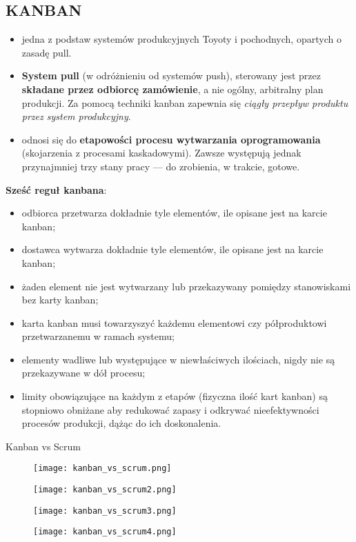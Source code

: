 \documentclass[a4paper]{article}
\begin{document}
    \subsection{KANBAN}
    \begin{itemize}
        \item jedna z podstaw systemów produkcyjnych Toyoty  i pochodnych, opartych o zasadę pull.
        \item \textbf{System pull} (w odróżnieniu od systemów push), sterowany
        jest przez \textbf{składane przez odbiorcę zamówienie}, a nie ogólny, arbitralny plan produkcji. Za pomocą
        techniki kanban zapewnia się \textit{ciągły przepływ produktu przez system produkcyjny}.
        \item odnosi się do \textbf{etapowości procesu wytwarzania
        oprogramowania} (skojarzenia z procesami kaskadowymi). Zawsze występują jednak przynajmniej trzy stany pracy — do
        zrobienia, w trakcie, gotowe.
    \end{itemize}

    \textbf{Sześć reguł kanbana}:
    \begin{itemize}
        \item odbiorca przetwarza dokładnie tyle elementów, ile opisane
        jest na karcie kanban;
        \item dostawca wytwarza dokładnie tyle elementów, ile opisane jest
        na karcie kanban;
        \item żaden element nie jest wytwarzany lub przekazywany
        pomiędzy stanowiskami bez karty kanban;
        \item karta kanban musi towarzyszyć każdemu elementowi czy
        półproduktowi przetwarzanemu w ramach systemu;
        \item elementy wadliwe lub występujące w niewłaściwych ilościach,
        nigdy nie są przekazywane w dół procesu;
        \item limity obowiązujące na każdym z etapów (fizyczna ilość kart
        kanban) są stopniowo obniżane aby redukować zapasy i
        odkrywać nieefektywności procesów produkcji, dążąc do ich
        doskonalenia.
    \end{itemize}

    Kanban vs Scrum
    \begin{figure}[H]
        \texttt{[image: kanban\_vs\_scrum.png]}
    \end{figure}
    \begin{figure}[H]
        \texttt{[image: kanban\_vs\_scrum2.png]}
    \end{figure}
    \begin{figure}[H]
        \texttt{[image: kanban\_vs\_scrum3.png]}
    \end{figure}
    \begin{figure}[H]
        \texttt{[image: kanban\_vs\_scrum4.png]}
    \end{figure}
\end{document}
